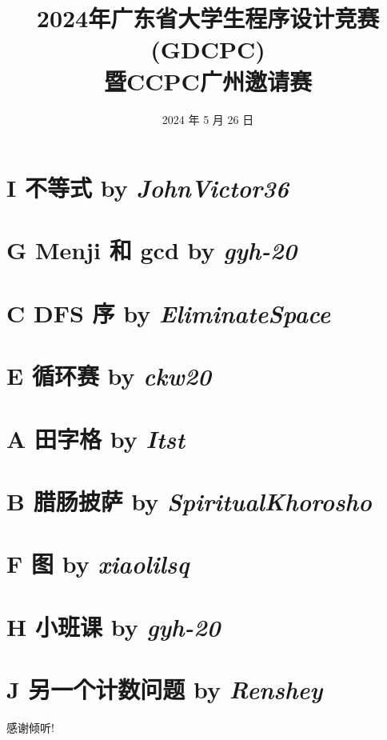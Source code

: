 \documentclass[dvipsnames]{ctexbeamer}
\title{2024年广东省大学生程序设计竞赛(GDCPC) \\ 暨CCPC广州邀请赛}
\author{}
\institute{清华大学学生算法协会}
\date{2024 年 5 月 26 日}
\begin{document}
\frame{\titlepage}


\frame[allowframebreaks]{
    \tableofcontents[sections={1-4}]
    \framebreak
    \tableofcontents[sections={6-10}]
}

\section{I 不等式 by \itshape JohnVictor36}


\section{G Menji 和 gcd by \itshape gyh-20}


\section{C DFS 序 by \itshape EliminateSpace}


\section{E 循环赛 by \itshape ckw20}




\section{A 田字格 by \itshape Itst}


\section{B 腊肠披萨 by \itshape SpiritualKhorosho}



% 


\section{F 图 by \itshape xiaolilsq}



\section{H 小班课 by \itshape gyh-20}



\section{J 另一个计数问题 by \itshape Renshey}


\begin{frame}{}
    \begin{center}
        \Large 感谢倾听!
    \end{center}
\end{frame}
\end{document}
